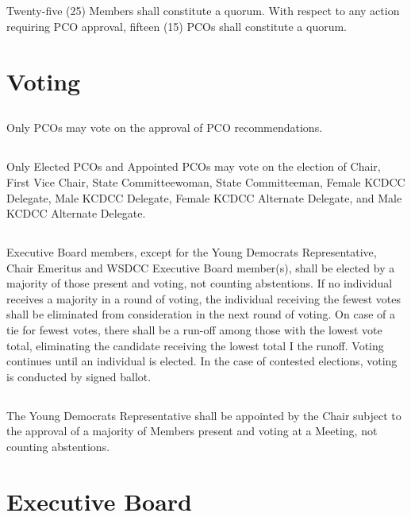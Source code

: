 \subsection{}
Twenty-five (25) Members shall constitute a quorum. With respect to any action requiring PCO approval, fifteen (15) PCOs shall constitute a quorum.

\section{Voting}
\subsection{}
Only PCOs may vote on the approval of PCO recommendations.

\subsection{}
Only Elected PCOs and Appointed PCOs may vote on the election of Chair, First Vice Chair, State Committeewoman, State Committeeman, Female KCDCC Delegate, Male KCDCC Delegate, Female KCDCC Alternate Delegate, and Male KCDCC Alternate Delegate.

\subsection{}
Executive Board members, except for the Young Democrats Representative, Chair Emeritus and WSDCC Executive Board member(s), shall be elected by a majority of those present and voting, not counting abstentions. If no individual receives a majority in a round of voting, the individual receiving the fewest votes shall be eliminated from consideration in the next round of voting. On case of a tie for fewest votes, there shall be a run-off among those with the lowest vote total, eliminating the candidate receiving the lowest total I the runoff.  Voting continues until an individual is elected. In the case of contested elections, voting is conducted by signed ballot.

\subsection{}
The Young Democrats Representative shall be appointed by the Chair subject to the approval of a majority of Members present and voting at a Meeting, not counting abstentions.

\section{Executive Board}
